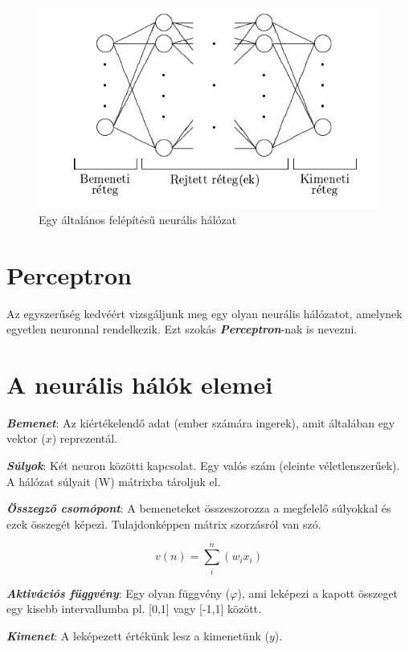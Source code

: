 \begin{figure}
	\centering
	\includegraphics[scale=0.75]{images/ANNLayers.png}
	\caption{Egy általános felépítésű neurális hálózat}
\end{figure}

\section{Perceptron}

Az egyszerűség kedvéért vizsgáljunk meg egy olyan neurális hálózatot, amelynek egyetlen neuronnal rendelkezik. Ezt szokás \textbf{\textit{Perceptron}}-nak is nevezni.

\section{A neurális hálók elemei}

\textbf{\textit{Bemenet}}: Az kiértékelendő adat (ember számára ingerek), amit általában egy vektor (\(x\)) reprezentál.

\textit{\textbf{Súlyok}}: Két neuron közötti kapcsolat. Egy valós szám (eleinte véletlenszerűek). A hálózat súlyait (W) mátrixba tároljuk el.

\textbf{\textit{Összegző csomópont}}: A bemeneteket összeszorozza a megfelelő súlyokkal és ezek összegét képezi. Tulajdonképpen mátrix szorzásról van szó.

\[v(n) = \sum_i^{n}(w_ix_i)\]

\textit{\textbf{Aktivációs függvény}}: Egy olyan függvény ($\varphi$), ami leképezi a kapott összeget egy kisebb intervallumba pl. [0,1] vagy [-1,1] között.

\textbf{\textit{Kimenet}}: A leképezett értékünk lesz a kimenetünk (\(y\)).

